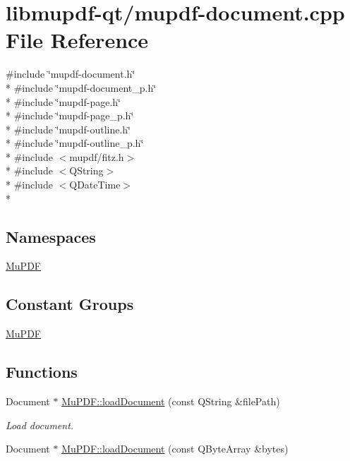 \hypertarget{mupdf-document_8cpp}{\section{libmupdf-\/qt/mupdf-\/document.cpp File Reference}
\label{mupdf-document_8cpp}
}
{\ttfamily \#include \char`\"{}mupdf-\/document.\-h\char`\"{}}\\*
{\ttfamily \#include \char`\"{}mupdf-\/document\-\_\-p.\-h\char`\"{}}\\*
{\ttfamily \#include \char`\"{}mupdf-\/page.\-h\char`\"{}}\\*
{\ttfamily \#include \char`\"{}mupdf-\/page\-\_\-p.\-h\char`\"{}}\\*
{\ttfamily \#include \char`\"{}mupdf-\/outline.\-h\char`\"{}}\\*
{\ttfamily \#include \char`\"{}mupdf-\/outline\-\_\-p.\-h\char`\"{}}\\*
{\ttfamily \#include $<$mupdf/fitz.\-h$>$}\\*
{\ttfamily \#include $<$Q\-String$>$}\\*
{\ttfamily \#include $<$Q\-Date\-Time$>$}\\*
\subsection*{Namespaces}
\begin{DoxyCompactItemize}
\item 
\hyperlink{namespace_mu_p_d_f}{Mu\-P\-D\-F}
\end{DoxyCompactItemize}
\subsection*{Constant Groups}
\begin{DoxyCompactItemize}
\item 
\hyperlink{namespace_mu_p_d_f}{Mu\-P\-D\-F}
\end{DoxyCompactItemize}
\subsection*{Functions}
\begin{DoxyCompactItemize}
\item 
Document $\ast$ \hyperlink{namespace_mu_p_d_f_a5cf746094bc9648aca0d4a83e3ac44b3}{Mu\-P\-D\-F\-::load\-Document} (const Q\-String \&file\-Path)
\begin{DoxyCompactList}\small\item\em Load document. \end{DoxyCompactList}\item 
Document $\ast$ \hyperlink{namespace_mu_p_d_f_a294a09188a3dcab290679752dfc8d52b}{Mu\-P\-D\-F\-::load\-Document} (const Q\-Byte\-Array \&bytes)
\end{DoxyCompactItemize}
